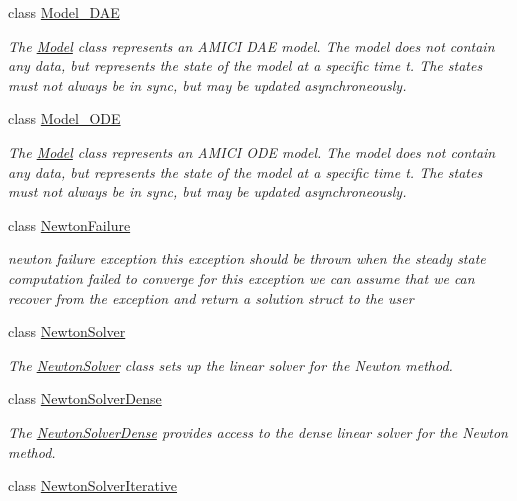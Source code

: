 \begin{DoxyCompactItemize}
class \mbox{\hyperlink{classamici_1_1_model___d_a_e}{Model\+\_\+\+D\+AE}}
\begin{DoxyCompactList}\small\item\em The \mbox{\hyperlink{classamici_1_1_model}{Model}} class represents an A\+M\+I\+CI D\+AE model. The model does not contain any data, but represents the state of the model at a specific time t. The states must not always be in sync, but may be updated asynchroneously. \end{DoxyCompactList}\item 
class \mbox{\hyperlink{classamici_1_1_model___o_d_e}{Model\+\_\+\+O\+DE}}
\begin{DoxyCompactList}\small\item\em The \mbox{\hyperlink{classamici_1_1_model}{Model}} class represents an A\+M\+I\+CI O\+DE model. The model does not contain any data, but represents the state of the model at a specific time t. The states must not always be in sync, but may be updated asynchroneously. \end{DoxyCompactList}\item 
class \mbox{\hyperlink{classamici_1_1_newton_failure}{Newton\+Failure}}
\begin{DoxyCompactList}\small\item\em newton failure exception this exception should be thrown when the steady state computation failed to converge for this exception we can assume that we can recover from the exception and return a solution struct to the user \end{DoxyCompactList}\item 
class \mbox{\hyperlink{classamici_1_1_newton_solver}{Newton\+Solver}}
\begin{DoxyCompactList}\small\item\em The \mbox{\hyperlink{classamici_1_1_newton_solver}{Newton\+Solver}} class sets up the linear solver for the Newton method. \end{DoxyCompactList}\item 
class \mbox{\hyperlink{classamici_1_1_newton_solver_dense}{Newton\+Solver\+Dense}}
\begin{DoxyCompactList}\small\item\em The \mbox{\hyperlink{classamici_1_1_newton_solver_dense}{Newton\+Solver\+Dense}} provides access to the dense linear solver for the Newton method. \end{DoxyCompactList}\item 
class \mbox{\hyperlink{classamici_1_1_newton_solver_iterative}{Newton\+Solver\+Iterative}}

\end{DoxyCompactItemize}
